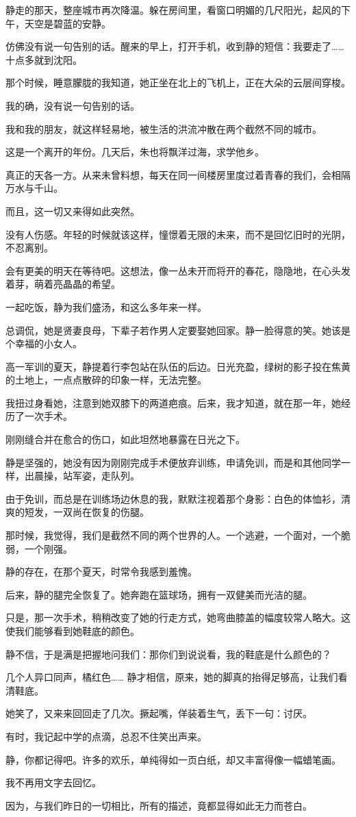 \documentclass[12pt,a4paper]{article}
\def\blankrev{\vspace{1ex}}									%
\begin{document}
		\blankrev
		静走的那天，整座城市再次降温。躲在房间里，看窗口明媚的几尺阳光，起风的下午，天空是碧蓝的安静。\par
		仿佛没有说一句告别的话。醒来的早上，打开手机，收到静的短信：我要走了…… 十点多就到沈阳。\par
		那个时候，睡意朦胧的我知道，她正坐在北上的飞机上，正在大朵的云层间穿梭。\par
		我的确，没有说一句告别的话。\par
		我和我的朋友，就这样轻易地，被生活的洪流冲散在两个截然不同的城市。

		\blankrev
		这是一个离开的年份。几天后，朱也将飘洋过海，求学他乡。\par
		真正的天各一方。从来未曾料想，每天在同一间楼房里度过着青春的我们，会相隔万水与千山。\par
		而且，这一切又来得如此突然。\par
		没有人伤感。年轻的时候就该这样，憧憬着无限的未来，而不是回忆旧时的光阴，不忍离别。\par
		会有更美的明天在等待吧。这想法，像一丛未开而将开的春花，隐隐地，在心头发着芽，萌着亮晶晶的希望。\par
		一起吃饭，静为我们盛汤，和这么多年来一样。\par
		总调侃，她是贤妻良母，下辈子若作男人定要娶她回家。静一脸得意的笑。她该是个幸福的小女人。\par
		高一军训的夏天，静提着行李包站在队伍的后边。日光充盈，绿树的影子投在焦黄的土地上，一点点散碎的印象一样，无法完整。\par
		我扭过身看她，注意到她双膝下的两道疤痕。后来，我才知道，就在那一年，她经历了一次手术。\par
		刚刚缝合并在愈合的伤口，如此坦然地暴露在日光之下。\par
		静是坚强的，她没有因为刚刚完成手术便放弃训练，申请免训，而是和其他同学一样，出晨操，站军姿，走队列。\par
		由于免训，而总是在训练场边休息的我，默默注视着那个身影：白色的体恤衫，清爽的短发，一双尚在恢复的伤腿。\par
		那时候，我觉得，我们是截然不同的两个世界的人。一个逃避，一个面对，一个脆弱，一个刚强。\par
		静的存在，在那个夏天，时常令我感到羞愧。\par
		后来，静的腿完全恢复了。她奔跑在篮球场，拥有一双健美而光洁的腿。\par
		只是，那一次手术，稍稍改变了她的行走方式，她弯曲膝盖的幅度较常人略大。这使我们能够看到她鞋底的颜色。\par
		静不信，于是满是把握地问我们：那你们到说说看，我的鞋底是什么颜色的？\par
		几个人异口同声，橘红色…… 静才相信，原来，她的脚真的抬得足够高，让我们看清鞋底。\par
		她笑了，又来来回回走了几次。撅起嘴，佯装着生气，丢下一句：讨厌。\par
		有时，我记起中学的点滴，总忍不住笑出声来。\par
		静，你都记得吧。许多的欢乐，单纯得如一页白纸，却又丰富得像一幅蜡笔画。\par
		我不再用文字去回忆。\par
		因为，与我们昨日的一切相比，所有的描述，竟都显得如此无力而苍白。
\end{document}
